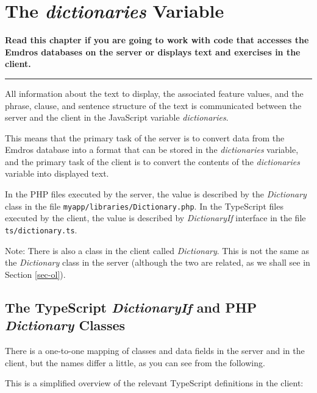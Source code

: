 \documentclass[11pt,oneside,a4paper]{memoir}
\begin{document}
\chapter{The \emph{dictionaries} Variable}\label{chap-dictionary}

\textbf{Read this chapter if you are going to work with code that accesses the Emdros databases on
  the server or displays text and exercises in the client.}
\plainbreak{3}

All information about the text to display, the associated feature values, and the phrase, clause,
and sentence structure of the text is communicated between the server and the client in the
JavaScript variable \emph{dictionaries}.

This means that the primary task of the server is to convert data from the Emdros database into a
format that can be stored in the \emph{dictionaries} variable, and the primary task of the client is
to convert the contents of the \emph{dictionaries} variable into displayed text.

In the PHP files executed by the server, the value is described by the \emph{Dictionary} class in
the file \texttt{myapp/libraries/Dictionary.php}. In the TypeScript files executed by the client,
the value is described by \emph{DictionaryIf} interface in the file \texttt{ts/dictionary.ts}.

Note: There is also a class in the client called \emph{Dictionary}. This is not the same as the
\emph{Dictionary} class in the server (although the two are related, as we shall see in Section
\ref{sec-ol}).


\section{The TypeScript \emph{DictionaryIf} and PHP \emph{Dictionary} Classes}\label{sec-dictionaryif}

There is a one-to-one mapping of classes and data fields in the server and in the client, but the
names differ a little, as you can see from the following.

This is a simplified overview of the relevant TypeScript definitions in the client:
\end{document}
